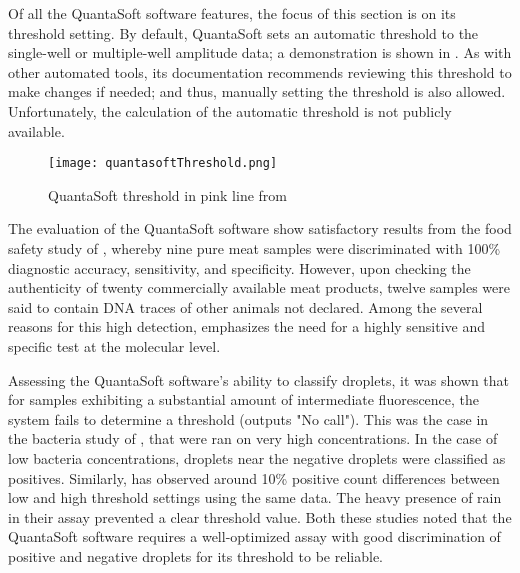 Of all the QuantaSoft software features, the focus of this section is on its threshold setting. By default, QuantaSoft sets an automatic threshold to the single-well or multiple-well amplitude data; a demonstration is shown in . As with other automated tools, its documentation recommends reviewing this threshold to make changes if needed; and thus, manually setting the threshold is also allowed. Unfortunately, the calculation of the automatic threshold is not publicly available.

\begin{figure}[h]
    \centering
    \texttt{[image: quantasoftThreshold.png]}
    \caption[QuantaSoft threshold from a study]{QuantaSoft threshold in pink line from \cite{hussainThreshold}}
        \label{fig:demoQuantThreshold}
\end{figure}

The evaluation of the QuantaSoft software show satisfactory results from the food safety study of , whereby nine pure meat samples were discriminated with 100\% diagnostic accuracy, sensitivity, and specificity. However, upon checking the authenticity of twenty commercially available meat products, twelve samples were said to contain DNA traces of other animals not declared. Among the several reasons for this high detection,  emphasizes the need for a highly sensitive and specific test at the molecular level.

Assessing the QuantaSoft software's ability to classify droplets, it was shown that for samples exhibiting a substantial amount of intermediate fluorescence, the system fails to determine a threshold (outputs "No call"). This was the case in the bacteria study of , that were ran on very high concentrations. In the case of low bacteria concentrations, droplets near the negative droplets were classified as positives. Similarly,  has observed around 10\% positive count differences between low and high threshold settings using the same data. The heavy presence of rain in their assay prevented a clear threshold value.  Both these studies noted that the QuantaSoft software requires a well-optimized assay with good discrimination of positive and negative droplets for its threshold to be reliable. 


